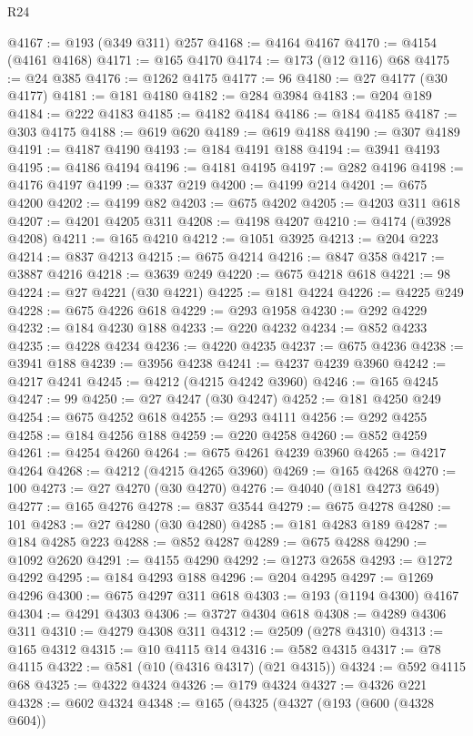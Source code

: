 \begin{lexlean}{R24}
\begin{coremodule}
@4167 := @193 (@349 @311) @257
@4168 := @4164 @4167
@4170 := @4154 (@4161 @4168)
@4171 := @165 @4170
@4174 := @173 (@12 @116) @68
@4175 := @24 @385
@4176 := @1262 @4175
@4177 := 96
@4180 := @27 @4177 (@30 @4177)
@4181 := @181 @4180
@4182 := @284 @3984
@4183 := @204 @189
@4184 := @222 @4183
@4185 := @4182 @4184
@4186 := @184 @4185
@4187 := @303 @4175
@4188 := @619 @620
@4189 := @619 @4188
@4190 := @307 @4189
@4191 := @4187 @4190
@4193 := @184 @4191 @188
@4194 := @3941 @4193
@4195 := @4186 @4194
@4196 := @4181 @4195
@4197 := @282 @4196
@4198 := @4176 @4197
@4199 := @337 @219
@4200 := @4199 @214
@4201 := @675 @4200
@4202 := @4199 @82
@4203 := @675 @4202
@4205 := @4203 @311 @618
@4207 := @4201 @4205 @311
@4208 := @4198 @4207
@4210 := @4174 (@3928 @4208)
@4211 := @165 @4210
@4212 := @1051 @3925
@4213 := @204 @223
@4214 := @837 @4213
@4215 := @675 @4214
@4216 := @847 @358
@4217 := @3887 @4216
@4218 := @3639 @249
@4220 := @675 @4218 @618
@4221 := 98
@4224 := @27 @4221 (@30 @4221)
@4225 := @181 @4224
@4226 := @4225 @249
@4228 := @675 @4226 @618
@4229 := @293 @1958
@4230 := @292 @4229
@4232 := @184 @4230 @188
@4233 := @220 @4232
@4234 := @852 @4233
@4235 := @4228 @4234
@4236 := @4220 @4235
@4237 := @675 @4236
@4238 := @3941 @188
@4239 := @3956 @4238
@4241 := @4237 @4239 @3960
@4242 := @4217 @4241
@4245 := @4212 (@4215 @4242 @3960)
@4246 := @165 @4245
@4247 := 99
@4250 := @27 @4247 (@30 @4247)
@4252 := @181 @4250 @249
@4254 := @675 @4252 @618
@4255 := @293 @4111
@4256 := @292 @4255
@4258 := @184 @4256 @188
@4259 := @220 @4258
@4260 := @852 @4259
@4261 := @4254 @4260
@4264 := @675 @4261 @4239 @3960
@4265 := @4217 @4264
@4268 := @4212 (@4215 @4265 @3960)
@4269 := @165 @4268
@4270 := 100
@4273 := @27 @4270 (@30 @4270)
@4276 := @4040 (@181 @4273 @649)
@4277 := @165 @4276
@4278 := @837 @3544
@4279 := @675 @4278
@4280 := 101
@4283 := @27 @4280 (@30 @4280)
@4285 := @181 @4283 @189
@4287 := @184 @4285 @223
@4288 := @852 @4287
@4289 := @675 @4288
@4290 := @1092 @2620
@4291 := @4155 @4290
@4292 := @1273 @2658
@4293 := @1272 @4292
@4295 := @184 @4293 @188
@4296 := @204 @4295
@4297 := @1269 @4296
@4300 := @675 @4297 @311 @618
@4303 := @193 (@1194 @4300) @4167
@4304 := @4291 @4303
@4306 := @3727 @4304 @618
@4308 := @4289 @4306 @311
@4310 := @4279 @4308 @311
@4312 := @2509 (@278 @4310)
@4313 := @165 @4312
@4315 := @10 @4115 @14
@4316 := @582 @4315
@4317 := @78 @4115
@4322 := @581 (@10 (@4316 @4317) (@21 @4315))
@4324 := @592 @4115 @68
@4325 := @4322 @4324
@4326 := @179 @4324
@4327 := @4326 @221
@4328 := @602 @4324
@4348 := @165
    (@4325
      (@4327
        (@193
          (@600 (@4328 @604))

\end{coremodule}
\end{lexlean}
